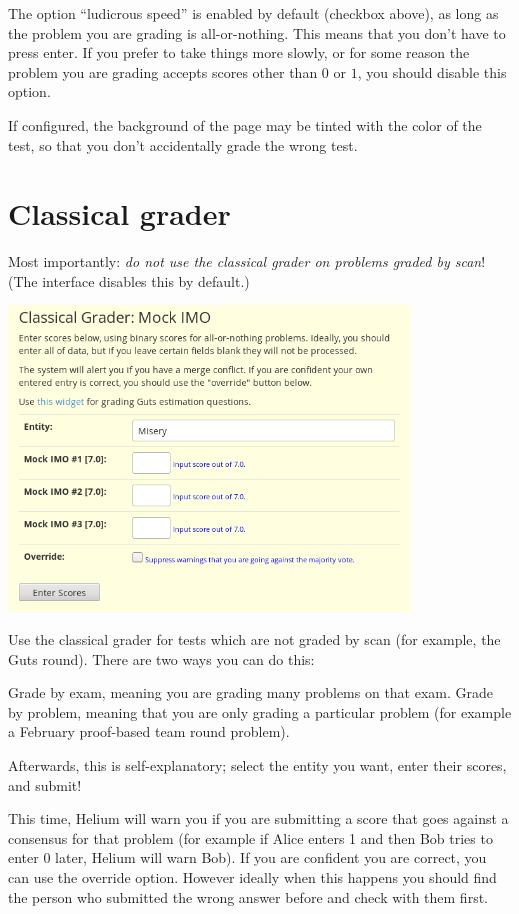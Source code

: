 The option ``ludicrous speed'' is enabled by default (checkbox above),
as long as the problem you are grading is all-or-nothing.
This means that you don't have to press enter.
If you prefer to take things more slowly,
or for some reason the problem you are grading accepts
scores other than $0$ or $1$,
you should disable this option.

If configured, the background of the page may be tinted
with the color of the test, so that you don't accidentally grade
the wrong test.

\section{Classical grader}
Most importantly:
\emph{do not use the classical grader on problems graded by scan}!
(The interface disables this by default.)

\begin{center}
	\includegraphics[width=0.8\textwidth]{images/classicgrade.png}
\end{center}

Use the classical grader for tests which are not graded by scan
(for example, the Guts round).
There are two ways you can do this:
\begin{itemize}
	\ii Grade by exam, meaning you are grading many problems on that exam.
	\ii Grade by problem, meaning that you are only grading 
	a particular problem (for example a February proof-based team round problem).
\end{itemize}
Afterwards, this is self-explanatory;
select the entity you want, enter their scores, and submit!

This time, Helium will warn you if you are submitting
a score that goes against a consensus for that problem
(for example if Alice enters 1 and then Bob tries to enter 0 later,
Helium will warn Bob).
If you are confident you are correct, you can use the override option.
However ideally when this happens you should find the person
who submitted the wrong answer before and check with them first.


